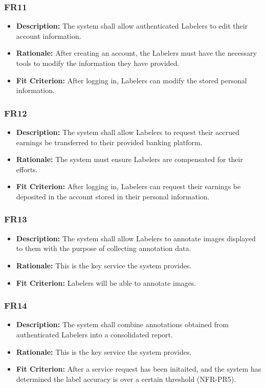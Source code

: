 \documentclass[12pt]{article}
\begin{document}
\subsubsection*{FR11}
\begin{itemize}
  \item \textbf{Description:} The system shall allow authenticated Labelers to edit their account information.
  \item \textbf{Rationale:} After creating an account, the Labelers must have the necessary tools to modify the information they have provided.
  \item \textbf{Fit Criterion:} After logging in, Labelers can modify the stored personal information.
\end{itemize}
\subsubsection*{FR12}
\begin{itemize}
  \item \textbf{Description:} The system shall allow Labelers to request their accrued earnings be transferred to their provided banking platform.
  \item \textbf{Rationale:} The system must ensure Labelers are compensated for their efforts.
\item \textbf{Fit Criterion:} After logging in, Labelers can request their earnings be deposited in the account stored in their personal information.
\end{itemize}
\subsubsection*{FR13}
\begin{itemize}
  \item \textbf{Description:} The system shall allow Labelers to annotate images displayed to them with the purpose of collecting annotation data.
  \item \textbf{Rationale:} This is the key service the system provides.
  \item \textbf{Fit Criterion:} Labelers will be able to annotate images.
\end{itemize}
\subsubsection*{FR14}
\begin{itemize}
  \item \textbf{Description:} The system shall combine annotations obtained from authenticated Labelers into a consolidated report.
  \item \textbf{Rationale:} This is the key service the system provides.
  \item \textbf{Fit Criterion:} After a service request has been initaited, and the system has determined the label accuracy is over a certain threshold (NFR-PR5).
\end{itemize}
\end{document}
